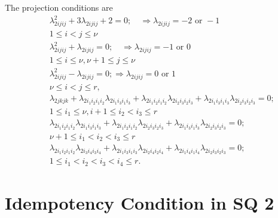 \documentclass[12pt]{article}
\begin{document}
The projection conditions are 
\begin{eqnarray}
\quad &&\left. \lambda \right. _{2ijij}^{2}+3\lambda _{2ijij}+2=0;\quad
\Rightarrow \lambda _{2ijij}=-2\text{ or }-1 \\
&&1\leq i<j\leq \nu \\
&&\lambda _{2ijij}^{2}+\lambda _{2ijij}=0;\quad \Rightarrow \lambda
_{2ijij}=-1\text{ or }0 \\
&&1\leq i\leq \nu ,\nu +1\leq j\leq \nu \\
&&\lambda _{2ijij}^{2}-\lambda _{2ijij}=0;\Rightarrow \lambda _{2ijij}=0%
\text{ or }1 \\
&&\nu \leq i<j\leq r, \\
&&\lambda _{2jkjk}+\lambda _{2i_{1}i_{2}i_{1}i_{2}}\lambda
_{2i_{1}i_{3}i_{1}i_{3}}+\lambda _{2i_{1}i_{2}i_{1}i_{2}}\lambda
_{2i_{2}i_{3}i_{2}i_{3}}+\lambda _{2i_{1}i_{3}i_{1}i_{3}}\lambda
_{2i_{2}i_{3}i_{2}i_{3}}=0;\quad \\
&&1\leq i_{1}\leq \nu ,i+1\leq i_{2}<i_{3}\leq r \\
&&\lambda _{2i_{1}i_{2}i_{1}i_{2}}\lambda _{2i_{1}i_{3}i_{1}i_{3}}+\lambda
_{2i_{1}i_{2}i_{1}i_{2}}\lambda _{2i_{2}i_{3}i_{2}i_{3}}+\lambda
_{2i_{1}i_{3}i_{1}i_{3}}\lambda _{2i_{2}i_{3}i_{2}i_{3}}=0;\quad \\
&&\nu +1\leq i_{1}<i_{2}<i_{3}\leq r \\
&&\lambda _{2i_{1}i_{2}i_{1}i_{2}}\lambda _{2i_{3}i_{4}i_{3}i_{4}}+\lambda
_{2i_{1}i_{3}i_{1}i_{3}}\lambda _{2i_{2}i_{4}i_{2}i_{4}}+\lambda
_{2i_{1}i_{4}i_{1}i_{4}}\lambda _{2i_{2}i_{3}i_{2}i_{3}}=0;\quad \\
&&1\leq i_{1}<i_{2}<i_{3}<i_{4}\leq r.
\end{eqnarray}

\section{Idempotency Condition in SQ 2}
\end{document}

